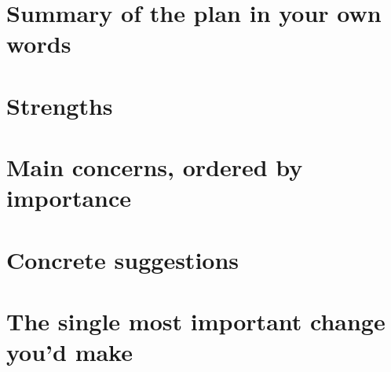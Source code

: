 \chapter{Summary of the plan in your own words}


\chapter{Strengths}


\chapter{Main concerns, ordered by importance}


\chapter{Concrete suggestions}


\chapter{The single most important change you'd make}
